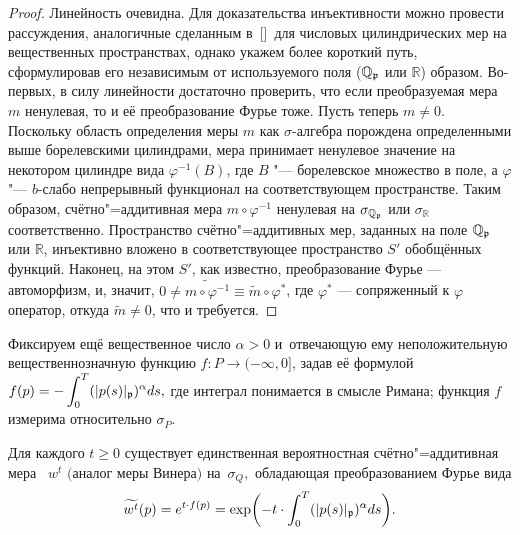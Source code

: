 \begin{proof}
 Линейность очевидна.
  Для доказательства инъективности %
  можно провести рассуждения,
  аналогичные сделанным в~[]\
  для числовых цилиндрических мер на вещественных
  пространствах,
  однако укажем
  более короткий путь,
   сформулировав его
  независимым от используемого поля ($\mathbb Q_{\mathfrak p}$ или ${\mathbb R}$)
  образом.
  Во-первых, в силу линейности достаточно проверить, что
  если преобразуемая мера $m$ ненулевая, то и её преобразование Фурье тоже.
  Пусть теперь $m\ne0$.
  Поскольку область определения меры
  $m$ как $\sigma $-алгебра порождена определенными выше борелевскими цилиндрами,
  мера принимает ненулевое значение на некотором цилиндре
  вида $\varphi ^{-1}( B)$,
  где $B$ "---
  борелевское   множество в поле, %
   а
   $\varphi $ "---
  $b$-слабо непрерывный
  функционал на соответствующем пространстве.
  Таким образом, счётно"=аддитивная мера $m\circ \varphi ^{-1}$
  ненулевая на $\sigma _{\mathbb Q_{\mathfrak p}}$ или $\sigma _{\mathbb R}$ соответственно.
 Пространство счётно"=аддитивных мер,
 заданных на поле $\mathbb Q_{\mathfrak p}$ или ${\mathbb R}$,
  инъективно
 вложено в соответствующее пространство $S'$ обобщённых функций.
  Наконец, на  этом
 $S'$, как известно, преобразование Фурье --- автоморфизм,
 и, значит,
 $0\ne \widetilde{m\circ \varphi ^{-1}}\equiv\widetilde m\circ \varphi ^*$,
 где $\varphi ^*$ --- %
 сопряженный к $\varphi $ оператор,
 откуда $\widetilde m\ne0$, что и требуется.
\end{proof}

\smallskip


 Фиксируем ещё вещественное число  $\alpha>0$  и~отвечающую ему неположительную вещественнозначную
 функцию
 $
 f
 :P\to(-\infty, 0]
 $,
 задав её формулой
 $ \displaystyle
 f
 (p)=-\int_0^T(|p(s)|_{\mathfrak p})^\alpha ds,
  $
  где интеграл понимается в смысле Римана;
  функция  $f$
 измерима относительно $\sigma _P$.

\smallskip

 \begin{theorem}[2] %
 Для каждого $t\geqslant 0$ существует
 единственная
 вероятностная счётно"=аддитивная мера~%
 $w^t$ $($аналог меры Винера\/$)$
 на~$\sigma _Q,$
 обладающая преобразованием Фурье
 вида
 $$
 \displaystyle
 \widetilde{w^t}(p)=
 e^{t\cdot f(p)}=\exp \biggl({\displaystyle -t\cdot\int_0^T(|p(s)|_{\mathfrak p})^\alpha ds }\biggr).
 $$
 \end{theorem} %


